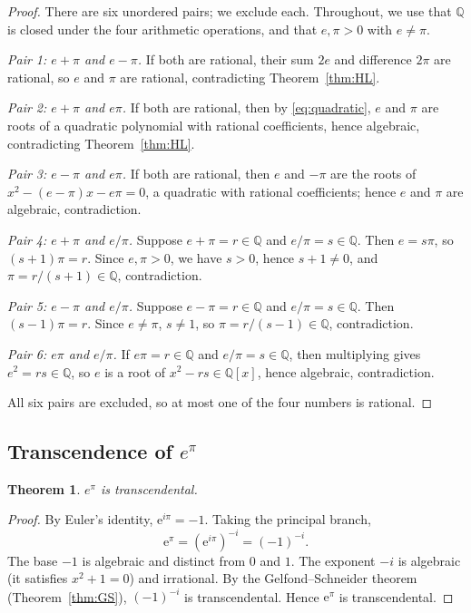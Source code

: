 \documentclass[11pt]{amsart}
\newtheorem{theorem}{Theorem}[section]
\theoremstyle{definition}
\theoremstyle{remark}
\numberwithin{equation}{section}
\newcommand{\Q}{\mathbb{Q}}
\newcommand{\ee}{\mathrm{e}}
\begin{document}
\begin{proof}
There are six unordered pairs; we exclude each. Throughout, we use that $\Q$ is closed under the four arithmetic operations, and that $e,\pi>0$ with $e\ne\pi$.

\emph{Pair 1: $e+\pi$ and $e-\pi$.} If both are rational, their sum $2e$ and difference $2\pi$ are rational, so $e$ and $\pi$ are rational, contradicting Theorem~\ref{thm:HL}.

\emph{Pair 2: $e+\pi$ and $e\pi$.} If both are rational, then by \eqref{eq:quadratic}, $e$ and $\pi$ are roots of a quadratic polynomial with rational coefficients, hence algebraic, contradicting Theorem~\ref{thm:HL}.

\emph{Pair 3: $e-\pi$ and $e\pi$.} If both are rational, then $e$ and $-\pi$ are the roots of $x^2-(e-\pi)x-e\pi=0$, a quadratic with rational coefficients; hence $e$ and $\pi$ are algebraic, contradiction.

\emph{Pair 4: $e+\pi$ and $e/\pi$.} Suppose $e+\pi=r\in\Q$ and $e/\pi=s\in\Q$. Then $e=s\pi$, so $(s+1)\pi=r$. Since $e,\pi>0$, we have $s>0$, hence $s+1\ne0$, and $\pi=r/(s+1)\in\Q$, contradiction.

\emph{Pair 5: $e-\pi$ and $e/\pi$.} Suppose $e-\pi=r\in\Q$ and $e/\pi=s\in\Q$. Then $(s-1)\pi=r$. Since $e\ne\pi$, $s\ne1$, so $\pi=r/(s-1)\in\Q$, contradiction.

\emph{Pair 6: $e\pi$ and $e/\pi$.} If $e\pi=r\in\Q$ and $e/\pi=s\in\Q$, then multiplying gives $e^2=rs\in\Q$, so $e$ is a root of $x^2-rs\in\Q[x]$, hence algebraic, contradiction.

All six pairs are excluded, so at most one of the four numbers is rational.
\end{proof}

\subsection{Transcendence of \texorpdfstring{$e^\pi$}{e\^{}pi}}

\begin{theorem}\label{thm:epi}
$e^\pi$ is transcendental.
\end{theorem}

\begin{proof}
By Euler's identity, $\ee^{i\pi}=-1$. Taking the principal branch,
\[
\ee^\pi=(\ee^{i\pi})^{-i}=(-1)^{-i}.
\]
The base $-1$ is algebraic and distinct from $0$ and $1$. The exponent $-i$ is algebraic (it satisfies $x^2+1=0$) and irrational. By the Gelfond--Schneider theorem (Theorem~\ref{thm:GS}), $(-1)^{-i}$ is transcendental. Hence $\ee^\pi$ is transcendental.
\end{proof}
\end{document}
